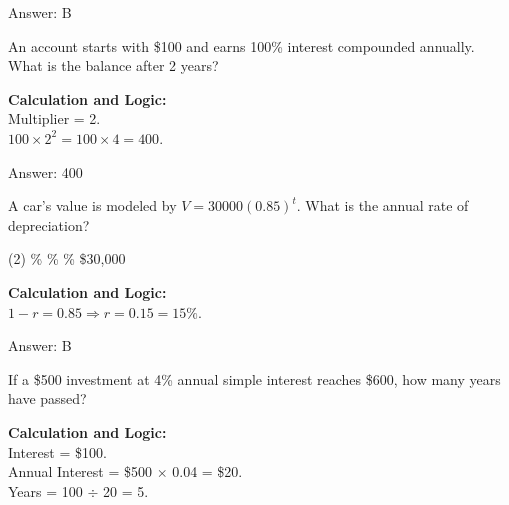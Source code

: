 \documentclass[11pt,paper=a4,answers]{exam}
\begin{document}
\begin{questions}
\begin{solution}
\vspace{30pt}

Answer: \colorbox{yellow!100}{B}
\end{solution}

\vspace{60pt}

\question
An account starts with \$100 and earns 100\% interest compounded annually. What is the balance after 2 years?

\begin{solution}
\textbf{Calculation and Logic:} \\
Multiplier = 2. \\
$100 \times 2^2 = 100 \times 4 = 400$.

\vspace{30pt}

Answer: \colorbox{yellow!100}{400}
\end{solution}

\vspace{60pt}

\question
A car's value is modeled by $V = 30000(0.85)^t$. What is the annual rate of depreciation?
\begin{tasks}(2)
    \%
    \%
    \%
    \task \$30,000
\end{tasks}

\begin{solution}
\textbf{Calculation and Logic:} \\
$1 - r = 0.85 \Rightarrow r = 0.15 = 15\%$.

\vspace{30pt}

Answer: \colorbox{yellow!100}{B}
\end{solution}

\vspace{60pt}

\question
If a \$500 investment at 4\% annual simple interest reaches \$600, how many years have passed?

\begin{solution}
\textbf{Calculation and Logic:} \\
Interest = \$100. \\
Annual Interest = \$500 $\times$ 0.04 = \$20. \\
Years = 100 $\div$ 20 = 5.


\end{solution}
\end{questions}
\end{document}
